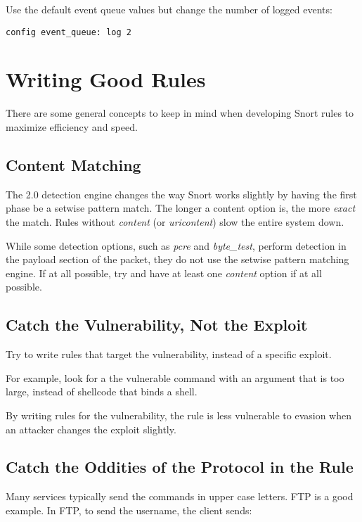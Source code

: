 \documentclass[english]{report}
\begin{document}
Use the default event queue values but change the number of logged events:
\begin{verbatim}
config event_queue: log 2
\end{verbatim}




\newpage
\section{Writing Good Rules}

There are some general concepts to keep in mind when developing Snort
rules to maximize efficiency and speed.

\subsection{Content Matching}
The 2.0 detection engine changes the way Snort works slightly by having the
first phase be a setwise pattern match.  The longer a content option is, the
more \emph{exact} the match.  Rules without \emph{content} (or
\emph{uricontent}) slow the entire system down.

While some detection options, such as \emph{pcre} and \emph{byte\_test},
perform detection in the payload section of the packet, they do not use the
setwise pattern matching engine.  If at all possible, try and have at least one
\emph{content} option if at all possible.

\subsection{Catch the Vulnerability, Not the Exploit}

Try to write rules that target the vulnerability, instead of a specific exploit.

For example, look for a the vulnerable command with an argument that is too
large, instead of shellcode that binds a shell.

By writing rules for the vulnerability, the rule is less vulnerable to evasion
when an attacker changes the exploit slightly.

\subsection{Catch the Oddities of the Protocol in the Rule}

Many services typically send the commands in upper case letters.  FTP is a good example.  In FTP, to send the username, the client sends:
\end{document}
